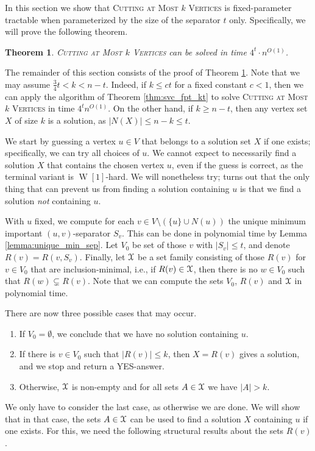\documentclass[a4paper,11pt]{article}
\newtheorem{theorem}{Theorem}
\theoremstyle{definition}
\theoremstyle{remark}
\newcommand{\X}{\EuScript{X}}
\newcommand{\card}[1]{\left\lvert {#1} \right\rvert}
\DeclareMathOperator{\operatorClassW}{W}
\newcommand{\classW}[1]{\ensuremath{\operatorClassW[#1]}}
\newcommand{\vbound}[1]{\card{N(#1)}}
\begin{document}
In this section we show that \textsc{Cutting at Most  $k$ Vertices} is fixed-parameter tractable when parameterized by the size of the separator $t$ only. 
Specifically, we will prove the following theorem.

\begin{theorem}\label{thm:svc_fpt}
\textsc{Cutting at Most  $k$ Vertices}  can be solved in time $4^{t}\cdot n^{O(1)}$.
\end{theorem}

The remainder of this section consists of the proof of Theorem \ref{thm:svc_fpt}. Note that we may assume $ \frac{3}{4}t < k < n - t$. Indeed, if $k \le c t$ for a fixed constant $c < 1$,  then we can apply the algorithm of Theorem \ref{thm:svc_fpt_kt} to solve \textsc{Cutting at Most  $k$ Vertices} in time $4^t n^{O(1)}$. On the other hand, if $k \geq n - t$, then any vertex set $X$ of size $k$ is a solution, as $\vbound{X} \le n - k \le t$.

We start by guessing a vertex $u \in V$ that belongs to a solution set $X$ if one exists; specifically, we can try all choices of $u$. We cannot expect to necessarily find a solution $X$ that contains the chosen vertex $u$, even if the guess is correct, as the terminal variant is \classW{1}-hard. We will nonetheless try; turns out that the only thing that can prevent us from finding a solution containing $u$ is that we find a solution \emph{not} containing $u$.

With $u$ fixed, we compute for each $v \in V \setminus (\{ u \} \cup N(u) )$ the unique minimum important $(u,v)$-separator $S_v$. This can be done in polynomial time by Lemma \ref{lemma:unique_min_sep}. Let $V_0$ be set of those $v$ with $\card{S_v} \le t$, and denote $R(v) = R(v,S_v)$. Finally, let $\X$ be a set family consisting of those $R(v)$ for $v \in V_0$ that are inclusion-minimal,
i.e., if $R(v)\in \X$, then there is no $w\in V_0$ such that $R(w) \subsetneq R(v)$. 
Note that we can compute the sets $V_0$, $R(v)$ and $\X$ in polynomial time.

There are now three possible cases that may occur.
\begin{enumerate}
    \item If $V_0=\emptyset$, we conclude that we have no solution containing $u$.
    \item If there is $v\in V_0$ such that $\card{R(v)}\leq k$, then $X=R(v)$ gives a solution, and we stop and return a YES-answer.
    \item Otherwise, $\X$ is non-empty and for all sets $A \in \X$ we have $\card{A}>k$.
\end{enumerate}
We only have to consider the last case, as otherwise we are done. We will show that in that case, the sets $A \in \X$ can be used to find a solution $X$ containing $u$ if one exists. For this, we need the following structural results about the sets $R(v)$.
\end{document}
